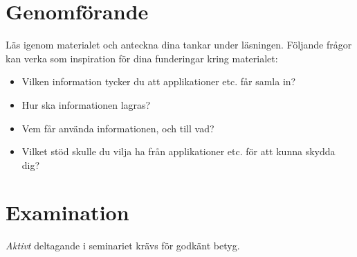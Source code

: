 \documentclass[a4paper,nocourse]{miunasgn}
\begin{document}
\section{Genomförande}
\noindent
Läs igenom materialet och anteckna dina tankar under läsningen.
Följande frågor kan verka som inspiration för dina funderingar kring 
materialet:
\begin{itemize}
	\item Vilken information tycker du att applikationer etc. får samla in?
	\item Hur ska informationen lagras?
	\item Vem får använda informationen, och till vad?
	\item Vilket stöd skulle du vilja ha från applikationer etc. för att kunna 
		skydda dig?
\end{itemize}


\section{Examination}
\label{sec:Examination}
\noindent
\emph{Aktivt} deltagande i seminariet krävs för godkänt betyg.



\end{document}
